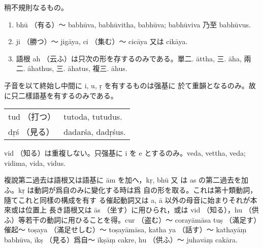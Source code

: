 \numberParagraph
稍不規則なるもの。
\begin{enumerate}[label=(\alph*)]
\item bhū （有る）～ babhūva, babhūvitha, babhūva;
babhūviva 乃至 babhūvus.
\item ji （勝つ）～ jigāya, ci （集む）～ cicāya 又は cikāya.
\item 語根 ah （云ふ）は只次の形を存するのみである。單二.
āttha, 三. āha, 兩二. āhathus, 三. āhatus, 複三. āhus.
\end{enumerate}

\numberParagraph
子音を以て終始し中間に i, u, ṛ を有するものは强基に
於て重韻となるのみ。故に只二樣語基を有するのみである。

\begin{tabular}{ll}
  tud （打つ） & tutoda, tutudus. \\
  dṛś （見る） & dadarśa, dadṛśus.
\end{tabular}

vid （知る）は重複しない。只强基に i を e とするのみ。veda,
vettha, veda; vidima, vida, vidus.

\numberParagraph
複說第二過去は語根又は語基に ām を加へ，kṛ, bhū 又
は as の第二過去を加ふ。kṛ は動詞が爲自のみに變化する時は爲
自の形を取る。これは第十類動詞，隨てこれと同樣の構成を有す
る催起動詞又は a, ā 以外の母音に始まりそれが本來或は位置上
長き語根又は ās （坐す）に用ひられ，或は vid （知る），hu （供
ふ）等若干の動詞に用ひることを得。cur （盗む）～ corayāmāsa
tuṣ （滿足す）催起～ toṣaya （滿足せしむ）～ toṣayāmāsa, katha\-%
ya （話す）～ kathayāṃ babhūva, īkṣ （見る）爲自～ īkṣāṃ cakre,
hu （供ふ）～ juhavāṃ cakāra.


